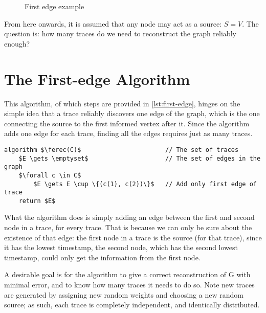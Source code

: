\begin{figure}[ht]
    \centering
    \caption{First edge example}
    \label{fig:first-edge-ex}
\end{figure}

From here onwards, it is assumed that any node may act as a source: $S = V$. The question is: how many traces do we need to reconstruct the graph reliably enough?

\section{The First-edge Algorithm}
This algorithm, of which steps are provided in \ref{lst:first-edge}, hinges on the simple idea that a trace reliably discovers one edge of the graph, which is the one connecting the source to the first informed vertex after it. Since the algorithm adds one edge for each trace, finding all the edges requires just as many traces.

\begin{lstlisting}[caption = {The First-edge algorithm}, label = {lst:first-edge}]
algorithm $\ferec(C)$                       // The set of traces
    $E \gets \emptyset$                     // The set of edges in the graph
    $\forall c \in C$
        $E \gets E \cup \{(c(1), c(2))\}$   // Add only first edge of trace
    return $E$
\end{lstlisting}

What the algorithm does is simply adding an edge between the first and second node in a trace, for every trace. That is because we can only be sure about the existence of that edge: the first node in a trace is the source (for that trace), since it has the lowest timestamp, the second node, which has the second lowest timestamp, could only get the information from the first node.

A desirable goal is for the algorithm to give a correct reconstruction of G with minimal error, and to know how many traces it needs to do so. Note new traces are generated by assigning new random weights and choosing a new random source; as such, each trace is completely independent, and identically distributed.


